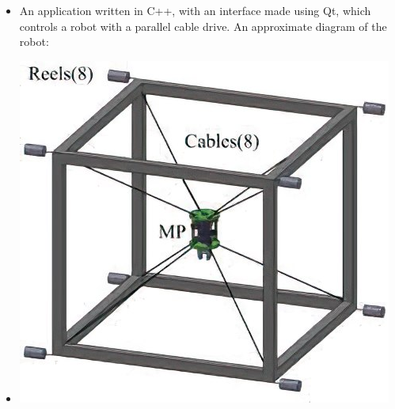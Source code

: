 \documentclass[10pt,a4paper,ragged2e]{altacv}
\begin{document}
\begin{itemize}
  \item An application written in C++, with an interface made using Qt, which controls a robot with a parallel cable drive. An approximate diagram of the robot:
  \item \includegraphics[scale=0.3]{Cube.jpg}
\end{itemize}
\smallskip

\smallskip
{}
\smallskip
{}
\smallskip

\clearpage

\nocite{*}
\end{document}

